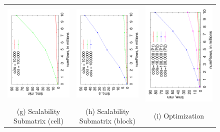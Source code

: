 \documentclass{vldb}
\begin{document}
\begin{figure}
\begin{tabular}{ccc}
\includegraphics[angle=-90,width=2.3in]{submatrix-cell.pdf} &
\hspace*{-0.2in}
\includegraphics[angle=-90,width=2.3in]{all-block.pdf} &
\hspace*{-0.2in}
\includegraphics[angle=-90,width=2.3in]{optimization.pdf} \\
(g) Scalability Submatrix (cell) & (h) Scalability Submatrix (block) & (i) Optimization \\



\end{tabular}
\end{figure}
\end{document}
